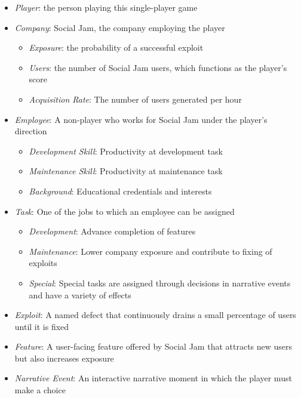 \documentclass[letterpaper]{article}
\begin{document}
\begin{itemize}
\item \textit{Player}: the person playing this single-player game

\item \textit{Company}: Social Jam, the company employing the player
 \begin{itemize}
 \item \textit{Exposure}: the probability of a successful exploit
 \item \textit{Users}: the number of Social Jam users, which functions as
                       the player's score
 \item \textit{Acquisition Rate}: The number of users generated per hour
 \end{itemize}

\item \textit{Employee}: A non-player who works for Social Jam under 
                        the player's direction
 \begin{itemize}
 \item \textit{Development Skill}: Productivity at development task
 \item \textit{Maintenance Skill}: Productivity at maintenance task
 \item \textit{Background}: Educational credentials and interests
 \end{itemize}

\item \textit{Task}: One of the jobs to which an employee can be assigned
 \begin{itemize}
 \item \textit{Development}: Advance completion of features
 \item \textit{Maintenance}: Lower company exposure and contribute to fixing
                             of exploits
 \item \textit{Special}: Special tasks are assigned through decisions in 
                         narrative events and have a variety of effects
 \end{itemize}

\item \textit{Exploit}: A named defect that continuously drains a small
                        percentage of users until it is fixed

\item \textit{Feature}: A user-facing feature offered by Social Jam 
                        that attracts new users but also increases
                        exposure

\item \textit{Narrative Event}: An interactive narrative moment
                         in which the player must make a choice

\end{itemize}
\end{document}
